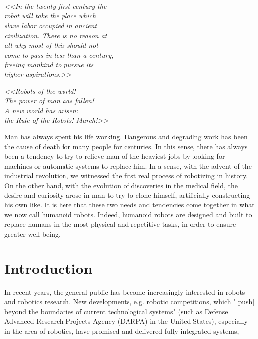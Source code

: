 \\
\\
\\
\begin{center}
    \textit{<<In the twenty-first century the \\
    robot will take the place which \\
    slave labor occupied in ancient \\ 
    civilization. There is no reason at \\ 
    all why most of this should not \\
    come to pass in less than a century, \\
    freeing mankind to pursue its \\
    higher aspirations.>>} \\ 
\end{center}


\begin{center}
    \textit{<<Robots of the world! \\
    The power of
man has fallen!\\ A new world has
arisen:\\ the Rule of the Robots!
March!>>}\\
\end{center}

Man has always spent his life working. Dangerous and degrading work has been the cause of death for many people for centuries. 
In this sense, there has always been a tendency to try to relieve man of the heaviest jobs by looking for machines or automatic systems to replace him.
In a sense, with the advent of the industrial revolution, we witnessed the first real process of robotizing in history.
On the other hand, with the evolution of discoveries in the medical field, the desire and curiosity arose in man to try to clone himself, artificially constructing his own like.
It is here that these two needs and tendencies come together in what we now call humanoid robots.
Indeed, humanoid robots are designed and built to replace humans in the most physical and repetitive tasks, in order to ensure greater well-being.

\newpage

\section{Introduction}
In recent years, the general public has become increasingly interested in robots and robotics research. New developments, e.g. robotic competitions, which "[push] beyond the boundaries of current technological
systems" (such as Defense Advanced Research Projects Agency (DARPA) in the
United States), especially in the area of robotics, have promised and delivered
fully integrated systems, \citet{robocomp}




